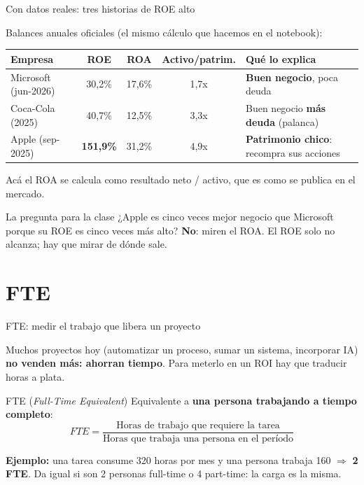 \documentclass[aspectratio=169,10pt]{beamer}
\begin{document}
\begin{frame}{Con datos reales: tres historias de ROE alto}

Balances anuales oficiales (el mismo cálculo que hacemos en el notebook):

\begin{center}
\small
\begin{tabular}{lcccl}
\toprule
\textbf{Empresa} & \textbf{ROE} & \textbf{ROA} & \textbf{Activo/patrim.} & \textbf{Qué lo explica} \\
\midrule
Microsoft (jun-2026)  & 30,2\%  & 17,6\% & 1,7x & \textbf{Buen negocio}, poca deuda \\
Coca-Cola (2025)      & 40,7\%  & 12,5\% & 3,3x & Buen negocio \textbf{más deuda} (palanca) \\
Apple (sep-2025)      & \textbf{151,9\%} & 31,2\% & 4,9x & \textbf{Patrimonio chico}: recompra sus acciones \\
\bottomrule
\end{tabular}
\end{center}

\small Acá el ROA se calcula como resultado neto / activo, que es como se publica en el mercado.

\vspace{0.2cm}
\begin{exampleblock}{La pregunta para la clase}
¿Apple es cinco veces mejor negocio que Microsoft porque su ROE es cinco veces más alto?
\textbf{No}: miren el ROA. El ROE solo no alcanza; hay que mirar de dónde sale.
\end{exampleblock}
\end{frame}

\section{FTE}

\begin{frame}{FTE: medir el trabajo que libera un proyecto}

Muchos proyectos hoy (automatizar un proceso, sumar un sistema, incorporar IA) \textbf{no venden más:
ahorran tiempo}. Para meterlo en un ROI hay que traducir horas a plata.

\begin{block}{FTE (\emph{Full-Time Equivalent})}
Equivalente a \textbf{una persona trabajando a tiempo completo}:
\[
FTE = \frac{\text{Horas de trabajo que requiere la tarea}}{\text{Horas que trabaja una persona en el período}}
\]
\end{block}

\textbf{Ejemplo:} una tarea consume 320 horas por mes y una persona trabaja 160 $\Rightarrow$
\textbf{2 FTE}. Da igual si son 2 personas full-time o 4 part-time: la carga es la misma.
\end{frame}
\end{document}

